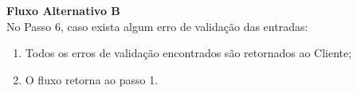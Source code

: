 \begin{anexosenv}
\begin{lista}
    \textbf{Fluxo Alternativo B} \\
    No Passo 6, caso exista algum erro de validação das entradas:
    \begin{enumerate}
    \item Todos os erros de validação encontrados são retornados ao Cliente;
    \item O fluxo retorna ao passo 1.
    \end{enumerate}
\end{lista}


\end{anexosenv}